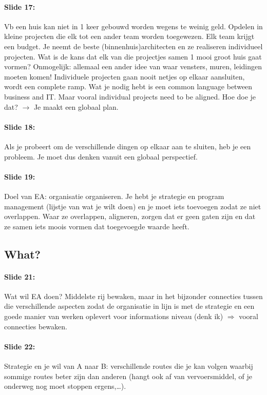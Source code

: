 \documentclass[10pt,a4paper]{report}
\begin{document}
\paragraph{Slide 17:}Vb een huis kan niet in 1 keer gebouwd worden wegens te weinig geld. Opdelen in kleine projecten die elk tot een ander team worden toegewezen. Elk team krijgt een budget. Je neemt de beste (binnenhuis)architecten en ze realiseren individueel projecten. Wat is de kans dat elk van die projectjes samen 1 mooi groot huis gaat vormen? Onmogelijk: allemaal een ander idee van waar vensters, muren, leidingen moeten komen! Individuele projecten gaan nooit netjes op elkaar aansluiten, wordt een complete ramp. Wat je nodig hebt is een common language between business and IT. Maar vooral individual projects need to be aligned. Hoe doe je dat? $\rightarrow$ Je maakt een globaal plan.

\paragraph{Slide 18:}Als je probeert om de verschillende dingen op elkaar aan te sluiten, heb je een probleem. Je moet dus denken vanuit een globaal perspectief.

\paragraph{Slide 19:}Doel van EA: organisatie organiseren. Je hebt je strategie en program management (lijstje van wat je wilt doen) en je moet iets toevoegen zodat ze niet overlappen. Waar ze overlappen, aligneren, zorgen dat er geen gaten zijn en dat ze samen iets moois vormen dat toegevoegde waarde heeft.

\subsection{What?}

\paragraph{Slide 21:}Wat wil EA doen? Middelste rij bewaken, maar in het bijzonder connecties tussen die verschillende aspecten zodat de organisatie in lijn is met de strategie en een goede manier van werken oplevert voor informations niveau (denk ik) $\Rightarrow$ vooral connecties bewaken.

\paragraph{Slide 22:}Strategie en je wil van A naar B: verschillende routes die je kan volgen waarbij sommige routes beter zijn dan anderen (hangt ook af van vervoersmiddel, of je onderweg nog moet stoppen ergens,…).
\end{document}
